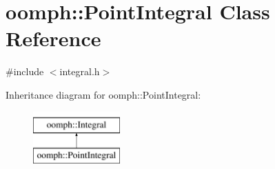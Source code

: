 \hypertarget{classoomph_1_1PointIntegral}{}\section{oomph\+:\+:Point\+Integral Class Reference}
\label{classoomph_1_1PointIntegral}


{\ttfamily \#include $<$integral.\+h$>$}

Inheritance diagram for oomph\+:\+:Point\+Integral\+:\begin{figure}[H]
\begin{center}
\leavevmode
\includegraphics[height=2.000000cm]{classoomph_1_1PointIntegral}
\end{center}
\end{figure}
